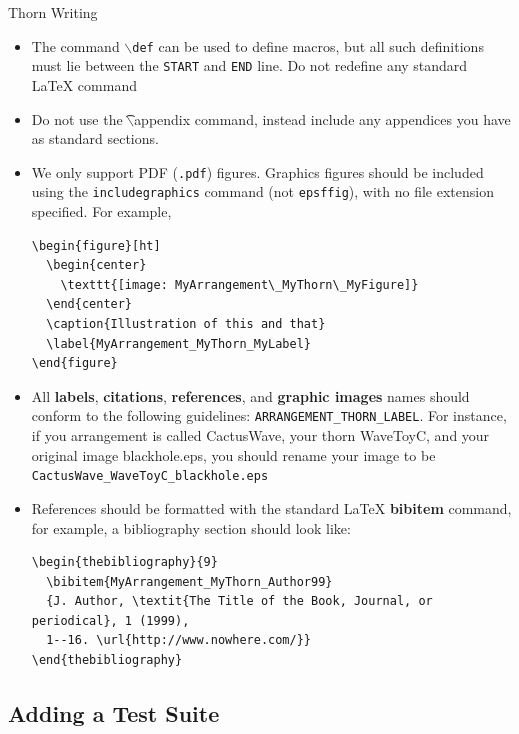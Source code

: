 \begin{cactuspart}{Thorn Writing}
\begin{itemize}
 \item The command \texttt{$\backslash$def} can be used to define macros, but all
   such definitions must lie between the \texttt{START} and \texttt{END}
   line. Do not redefine any standard LaTeX command

 \item Do not use the {\t $\backslash$appendix} command, instead include any appendices
        you have as standard sections.

 \item We only support PDF (\texttt{.pdf}) figures.
   Graphics figures should be included using the \texttt{includegraphics}
   command (not \texttt{epsffig}), with no file extension specified. For example,
%
\begin{verbatim}
\begin{figure}[ht]
  \begin{center}
    \texttt{[image: MyArrangement\_MyThorn\_MyFigure]}
  \end{center}
  \caption{Illustration of this and that}
  \label{MyArrangement_MyThorn_MyLabel}
\end{figure}
\end{verbatim}

 \item All {\bf labels}, {\bf citations}, {\bf references}, and {\bf
   graphic images} names should conform to the following guidelines:
   \texttt{ARRANGEMENT\_THORN\_LABEL}.  For instance, if you arrangement is
   called CactusWave, your thorn WaveToyC, and your original image
   blackhole.eps, you should rename your image to be {\tt
     CactusWave\_WaveToyC\_blackhole.eps}

 \item References should be formatted with the standard LaTeX {\bf
        bibitem} command, for example, a bibliography section should
        look like:
%
\begin{verbatim}
\begin{thebibliography}{9}
  \bibitem{MyArrangement_MyThorn_Author99}
  {J. Author, \textit{The Title of the Book, Journal, or periodical}, 1 (1999),
  1--16. \url{http://www.nowhere.com/}}
\end{thebibliography}
\end{verbatim}

\end{itemize}


\subsection{Adding a Test Suite}
\label{sec:adding_test_suite}


\end{cactuspart}
